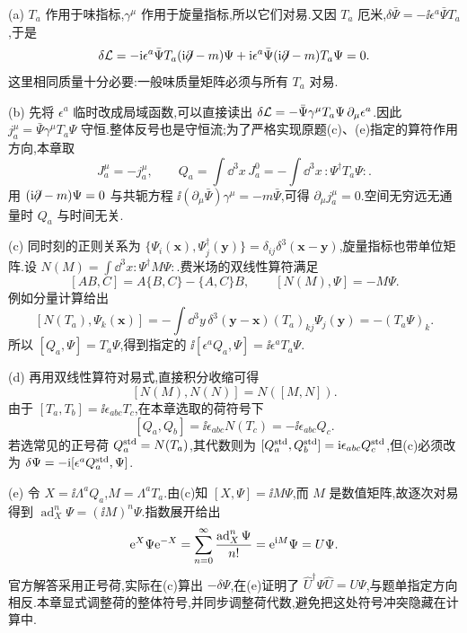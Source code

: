 \begin{solution}
(a) $T_a$ 作用于味指标,$\gamma^\mu$ 作用于旋量指标,所以它们对易.又因 $T_a$ 厄米,$\delta\bar\Psi=-\ii\epsilon^a\bar\Psi T_a$,于是
\[
\delta\mathcal L=-\mathrm i\epsilon^a\bar\Psi T_a(\mathrm i\mathord{\not\mathrel{\partial}}-m)\Psi
+\mathrm i\epsilon^a\bar\Psi(\mathrm i\mathord{\not\mathrel{\partial}}-m)T_a\Psi=0.
\]
这里相同质量十分必要:一般味质量矩阵必须与所有 $T_a$ 对易.

(b) 先将 $\epsilon^a$ 临时改成局域函数,可以直接读出 $\delta\mathcal L=-\bar\Psi\gamma^\mu T_a\Psi\,\partial_\mu\epsilon^a$.因此 $j_a^\mu=\bar\Psi\gamma^\mu T_a\Psi$ 守恒.整体反号也是守恒流;为了严格实现原题(c)、(e)指定的算符作用方向,本章取
\[
J_a^\mu=-j_a^\mu,
\qquad Q_a=\int\dd^3x\,J_a^0=-\int\dd^3x\,:\Psi^\dagger T_a\Psi:.
\]
用 $(\mathrm i\mathord{\not\mathrel{\partial}}-m)\Psi=0$ 与共轭方程 $\ii(\partial_\mu\bar\Psi)\gamma^\mu=-m\bar\Psi$,可得 $\partial_\mu j_a^\mu=0$.空间无穷远无通量时 $Q_a$ 与时间无关.

(c) 同时刻的正则关系为 $\{\Psi_i(\mathbf x),\Psi_j^\dagger(\mathbf y)\}=\delta_{ij}\delta^3(\mathbf x-\mathbf y)$,旋量指标也带单位矩阵.设 $N(M)=\int\dd^3x:\Psi^\dagger M\Psi:$.费米场的双线性算符满足
\[
[AB,C]=A\{B,C\}-\{A,C\}B,
\qquad [N(M),\Psi]=-M\Psi.
\]
例如分量计算给出
\[
[N(T_a),\Psi_k(\mathbf x)]
=-\int\dd^3y\,\delta^3(\mathbf y-\mathbf x)(T_a)_{kj}\Psi_j(\mathbf y)
=-(T_a\Psi)_k.
\]
所以 $[Q_a,\Psi]=T_a\Psi$,得到指定的 $\ii[\epsilon^aQ_a,\Psi]=\ii\epsilon^aT_a\Psi$.

(d) 再用双线性算符对易式,直接积分收缩可得
\[
[N(M),N(N)]=N([M,N]).
\]
由于 $[T_a,T_b]=\ii\epsilon_{abc}T_c$,在本章选取的荷符号下
\[
[Q_a,Q_b]=\ii\epsilon_{abc}N(T_c)=-\ii\epsilon_{abc}Q_c.
\]
若选常见的正号荷 $Q_a^{\rm std}=N(T_a)$,其代数则为 $[Q_a^{\rm std},Q_b^{\rm std}]=\mathrm i\epsilon_{abc}Q_c^{\rm std}$,但(c)必须改为 $\delta\Psi=-\mathrm i[\epsilon^aQ_a^{\rm std},\Psi]$.

(e) 令 $X=\ii\Lambda^aQ_a$,$M=\Lambda^aT_a$.由(c)知 $[X,\Psi]=\ii M\Psi$,而 $M$ 是数值矩阵,故逐次对易得到 $\operatorname{ad}_X^n\Psi=(\ii M)^n\Psi$.指数展开给出
\[
\mathrm e^X\Psi\mathrm e^{-X}
=\sum_{n=0}^\infty\frac{\operatorname{ad}_X^n\Psi}{n!}
=\mathrm e^{\mathrm i M}\Psi=U\Psi.
\]
官方解答采用正号荷,实际在(c)算出 $-\delta\Psi$,在(e)证明了 $\widehat U^\dagger\Psi\widehat U=U\Psi$,与题单指定方向相反.本章显式调整荷的整体符号,并同步调整荷代数,避免把这处符号冲突隐藏在计算中.
\end{solution}

